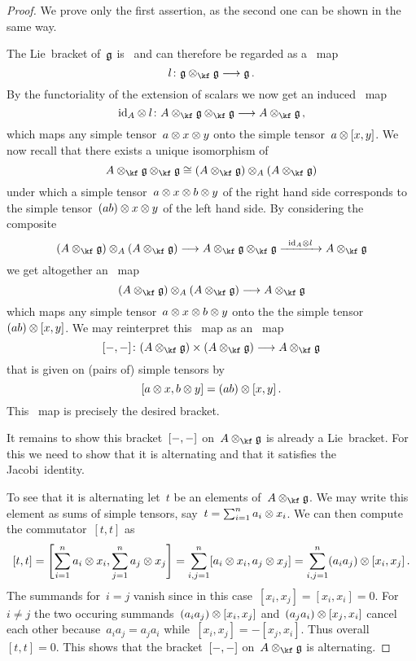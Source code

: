 \begin{proof}
	We prove only the first assertion, as the second one can be shown in the same way.

	The Lie~bracket of~$\mathfrak{g}$ is~\bilinear{$\kf$} and can therefore be regarded as a~\linear{$\kf$} map
	\[
		l \colon \glie \tensor_{\kf} \glie \to \glie \,.
	\]
	By the functoriality of the extension of scalars we now get an induced~ map
	\[
		\id_A \tensor l
		\colon
		A \tensor_{\kf} \glie \tensor_{\kf} \glie
		\to
		A \tensor_{\kf} \glie \,,
	\]
	which maps any simple tensor~$a \otimes x \otimes y$ onto the simple tensor~$a \otimes [x,y]$.
	We now recall that there exists a unique isomorphism of~
	\[
		A \tensor_{\kf} \glie \tensor_{\kf} \glie
		\cong
		( A \tensor_{\kf} \glie ) \tensor_A ( A \tensor_{\kf} \glie )
	\]
	under which a simple tensor~$a \otimes x \otimes b \otimes y$ of the right hand side corresponds to the simple tensor~$(ab) \otimes x \otimes y$ of the left hand side.
	By considering the composite
	\[
		(A \tensor_{\kf} \glie) \tensor_A (A \tensor_{\kf} \glie)
		\to
		A \tensor_{\kf} \glie \tensor_{\kf} \glie
		\xto{\id_A \tensor l}
		A \tensor_{\kf} \glie
	\]
	we get altogether an~{} map
	\[
		(A \tensor_{\kf} \glie) \tensor_A (A \tensor_{\kf} \glie)
		\to
		A \tensor_{\kf} \glie
	\]
	which maps any simple tensor~$a \otimes x \otimes b \otimes y$ onto the the simple tensor~$(ab) \otimes [x,y]$.
	We may reinterpret this~ map as an~ map
	\[
		[\ph, \ph]
		\colon
		(A \tensor_{\kf} \glie) \times (A \tensor_{\kf} \glie)
		\to
		A \tensor_{\kf} \glie
	\]
	that is given on (pairs of) simple tensors by
	\[
		[a \otimes x, b \otimes y]
		=
		(ab) \otimes [x,y] \,.
	\]
	This~ map is precisely the desired bracket.

	It remains to show this bracket~$[-, -]$ on~$A \tensor_{\kf} \glie$ is already a Lie~bracket.
	For this we need to show that it is alternating and that it satisfies the Jacobi~identity.

	To see that it is alternating let~$t$ be an elements of~$A \tensor_{\kf} \glie$.
	We may write this element as sums of simple tensors, say~$t = \sum_{i=1}^n a_i \otimes x_i$.
	We can then compute the commutator~$[t, t]$ as
	\[
		[t, t]
		=
		\Biggl[
			\sum_{i=1}^n a_i \otimes x_i,
			\sum_{j=1}^n a_j \otimes x_j
		\Biggr]
		=
		\sum_{i, j = 1}^n
		[ a_i \otimes x_i, a_j \otimes x_j ]
		=
		\sum_{i, j = 1}^n
		( a_i a_j ) \otimes [ x_i, x_j ] \,.
	\]
	The summands for~$i = j$ vanish since in this case~$[x_i, x_j] = [x_i, x_i] = 0$.
	For~$i \neq j$ the two occuring summands~$(a_i a_j) \otimes [x_i, x_j]$ and~$(a_j a_i) \otimes [x_j, x_i]$ cancel each other because~$a_i a_j = a_j a_i$ while~$[x_i, x_j] = -[x_j, x_i]$.
	Thus overall~$[t, t] = 0$.
	This shows that the bracket~$[-, -]$ on~$A \tensor_{\kf} \glie$ is alternating.


\end{proof}
